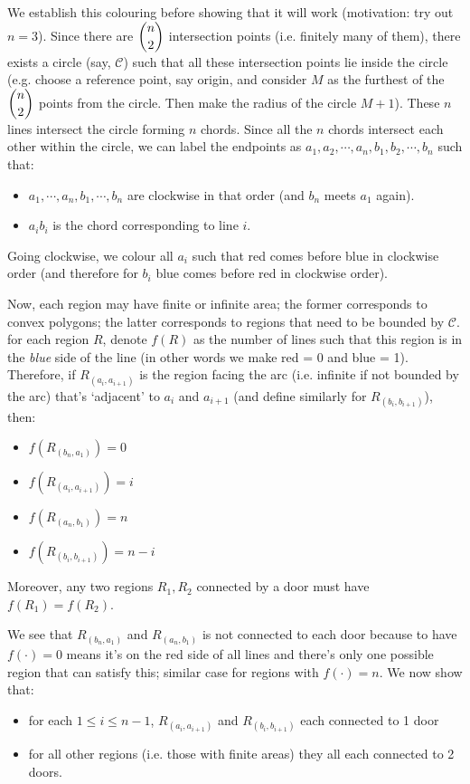 \documentclass[11pt,a4paper]{article}
\begin{document}
\begin{enumerate}
	We establish this colouring before showing that it will work (motivation: try out $n=3$). Since there are $\dbinom{n}{2}$ intersection points (i.e. finitely many of them), there exists a circle (say, $\mathcal{C}$) such that all these intersection points lie inside the circle (e.g. choose a reference point, say origin, and consider $M$ as the furthest of the $\dbinom{n}{2}$ points from the circle. Then make the radius of the circle $M+1$). These $n$ lines intersect the circle forming $n$ chords. 
	Since all the $n$ chords intersect each other within the circle, we can label the endpoints as $a_1, a_2, \cdots , a_n, b_1, b_2, \cdots, b_n$ such that: 
	\begin{itemize}
		\item $a_1, \cdots, a_n, b_1, \cdots, b_n$ are clockwise in that order (and $b_n$ meets $a_1$ again). 
		\item $a_ib_i$ is the chord corresponding to line $i$. 
	\end{itemize}
	Going clockwise, we colour all $a_i$ such that red comes before blue in clockwise order (and therefore for $b_i$ blue comes before red in clockwise order). 
	
	Now, each region may have finite or infinite area; the former corresponds to convex polygons; the latter corresponds to regions that need to be bounded by $\mathcal{C}$. for each region $R$, denote $f(R)$ as the number of lines such that this region is in the \emph{blue} side of the line (in other words we make red = 0 and blue = 1). Therefore, if $R_{(a_i, a_{i+1})}$ is the region facing the arc (i.e. infinite if not bounded by the arc) that's `adjacent' to $a_i$ and $a_{i+1}$ (and define similarly for $R_{(b_i, b_{i+1})}$), then: 
	\begin{itemize}
		\item $f(R_{(b_n, a_1)})=0$
		\item $f(R_{(a_i, a_{i+1})})=i$
		\item $f(R_{(a_n, b_1)})=n$
		\item $f(R_{(b_i, b_{i+1})})=n-i$
	\end{itemize}
	Moreover, any two regions $R_1, R_2$ connected by a door must have $f(R_1)=f(R_2)$. 
	
	We see that $R_{(b_n, a_1)}$ and $R_{(a_n, b_1)}$ is not connected to each door because to have $f(\cdot)=0$ means it's on the red side of all lines and there's only one possible region that can satisfy this; similar case for regions with $f(\cdot)=n$. We now show that: 
	\begin{itemize}
		\item for each $1\le i\le n-1$, $R_{(a_i, a_{i+1})}$ and $R_{(b_i, b_{i+1})}$ each connected to 1 door 
		\item for all other regions (i.e. those with finite areas) they all each connected to 2 doors. 
	\end{itemize}
	

\end{enumerate}
\end{document}
